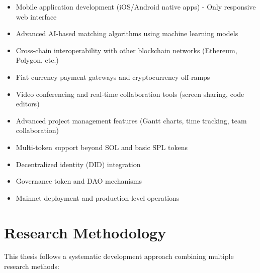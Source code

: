 \documentclass[a4paper,13pt,twoside]{report}
\theoremstyle{definition}
\begin{document}
\begin{itemize}
    \item Mobile application development (iOS/Android native apps) - Only responsive web interface
    \item Advanced AI-based matching algorithms using machine learning models
    \item Cross-chain interoperability with other blockchain networks (Ethereum, Polygon, etc.)
    \item Fiat currency payment gateways and cryptocurrency off-ramps
    \item Video conferencing and real-time collaboration tools (screen sharing, code editors)
    \item Advanced project management features (Gantt charts, time tracking, team collaboration)
    \item Multi-token support beyond SOL and basic SPL tokens
    \item Decentralized identity (DID) integration
    \item Governance token and DAO mechanisms
    \item Mainnet deployment and production-level operations
\end{itemize}

\section{Research Methodology}

This thesis follows a systematic development approach combining multiple research methods:
\end{document}
